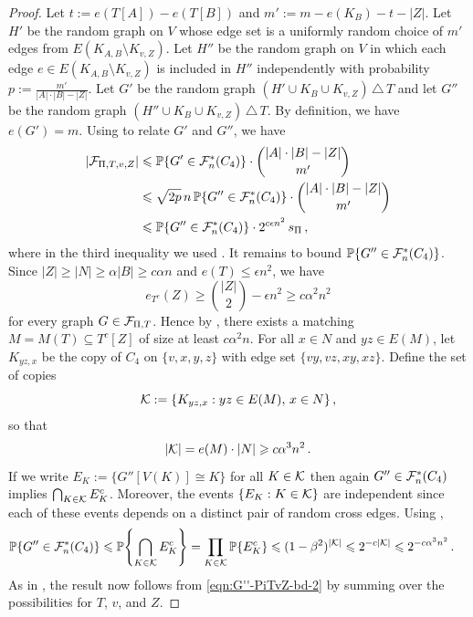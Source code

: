 \begin{proof}
Let $t:=e(T[A])-e(T[B])$ and $m':=m-e(K_B)-t-|Z|$. Let $H'$ be the random graph on $V$ whose edge set is a uniformly random choice of $m'$ edges from $E(K_{A,B}\setminus K_{v,Z})$. Let $H''$ be the random graph on $V$ in which each edge $e\in E(K_{A,B}\setminus K_{v,Z})$ is included in $H''$ independently with probability $p:=\frac{m'}{|A|\cdot|B|-|Z|}$. Let $G'$ be the random graph $(H'\cup K_B\cup K_{v,Z})\,\triangle\,T$ and let $G''$ be the random graph $(H''\cup K_B\cup K_{v,Z})\,\triangle\,T$. By definition, we have $e(G')=m$. Using \cite[Lemma~A.4]{perkins2025typical} to relate $G'$ and $G''$, we have
\begin{align}
|{\mathcal F}_{\Pi,T,v,Z}| &\leqslant {\mathbb P}\{G'\in{\mathcal F}^\ast_n(C_4)\}\cdot\binom{|A|\cdot|B|-|Z|}{m'} \nonumber\\
&\leqslant \sqrt{2p}\,n\,{\mathbb P}\{G''\in{\mathcal F}^\ast_n(C_4)\}\cdot\binom{|A|\cdot|B|-|Z|}{m'} \nonumber\\
&\leqslant {\mathbb P}\{G''\in{\mathcal F}^\ast_n(C_4)\} \cdot 2^{c\epsilon n^2}\,s_\Pi \,, \label{eqn:G''-PiTvZ-bd-2}
\end{align}
where in the third inequality we used \cite[Lemma~A.1(i),(ii),(iii)]{perkins2025typical}.
It remains to bound ${\mathbb P}\{G''\in{\mathcal F}^\ast_n(C_4)\}$. Since $|Z|\geq|N|\geq\alpha|B|\geq c\alpha n$ and $e(T)\leq\epsilon n^2$, we have
$$e_{T^c}(Z)\geq\binom{|Z|}{2}-\epsilon n^2\geq c\alpha^2n^2$$
for every graph $G\in{\mathcal F}_{\Pi,T}$. Hence by \cite[Lemma~A.3]{perkins2025typical}, there exists a matching $M=M(T)\subseteq T^c[Z]$ of size at least $c\alpha^2n$. For all $x\in N$ and $yz\in E(M)$, let $K_{yz,x}$ be the copy of $C_4$ on $\{v,x,y,z\}$ with edge set $\{vy,vz,xy,xz\}$. Define the set of copies
$${\mathcal K}:=\{K_{yz,x}:yz\in E(M),\,x\in N\}\,,$$
so that
$$|{\mathcal K}|=e(M)\cdot |N|\geqslant c\alpha^3n^2\,.$$
If we write $E_K:=\{G''[V(K)]\cong K\}$ for all $K\in{\mathcal K}$ then again $G''\in{\mathcal F}^\ast_n(C_4)$ implies $\bigcap_{K\in{\mathcal K}}E_K^c$. Moreover, the events $\{E_K:K\in{\mathcal K}\}$ are independent since each of these events depends on a distinct pair of random cross edges. Using ,
\begin{align*}
{\mathbb P}\{G''\in{\mathcal F}^\ast_n(C_4)\} &\leqslant {\mathbb P}\!\left\{\bigcap_{K\in{\mathcal K}}E_K^c\right\}=\prod_{K\in{\mathcal K}}{\mathbb P}\{E_K^c\} \leqslant (1-\beta^2)^{|{\mathcal K}|} \leqslant 2^{-c|{\mathcal K}|}\leqslant 2^{-c\alpha^3n^2}\,.
\end{align*}
As in , the result now follows from \eqref{eqn:G''-PiTvZ-bd-2} by summing over the possibilities for $T$, $v$, and $Z$.
\end{proof}

